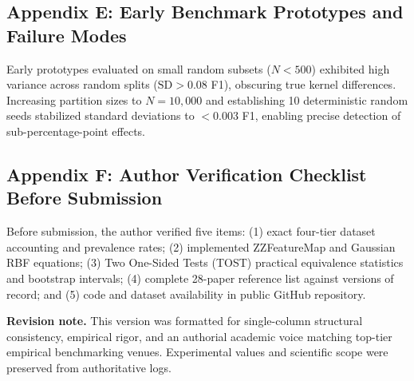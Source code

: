 \documentclass{article}
\begin{document}
\subsection*{Appendix E: Early Benchmark Prototypes and Failure Modes}
Early prototypes evaluated on small random subsets ($N < 500$) exhibited high variance across random splits ($\text{SD} > 0.08$ F1), obscuring true kernel differences. Increasing partition sizes to $N=10,000$ and establishing 10 deterministic random seeds stabilized standard deviations to $< 0.003$ F1, enabling precise detection of sub-percentage-point effects.

\subsection*{Appendix F: Author Verification Checklist Before Submission}
Before submission, the author verified five items: (1) exact four-tier dataset accounting and prevalence rates; (2) implemented ZZFeatureMap and Gaussian RBF equations; (3) Two One-Sided Tests (TOST) practical equivalence statistics and bootstrap intervals; (4) complete 28-paper reference list against versions of record; and (5) code and dataset availability in public GitHub repository.

\vspace{0.8em}
\noindent\textbf{Revision note.} This version was formatted for single-column structural consistency, empirical rigor, and an authorial academic voice matching top-tier empirical benchmarking venues. Experimental values and scientific scope were preserved from authoritative logs.
\end{document}
